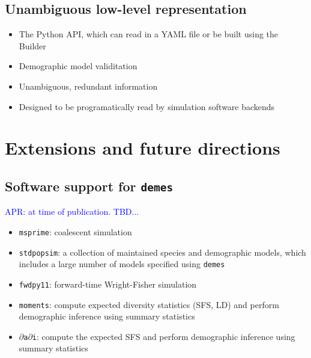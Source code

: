 \documentclass[11pt]{article}
\newenvironment{code}{\captionsetup{type=listing}\centering}{}
\newcommand{\msprime}[0]{\texttt{msprime}}
\newcommand{\stdpopsim}[0]{\texttt{stdpopsim}}
\newcommand{\demes}[0]{\texttt{demes}}
\newcommand{\moments}[0]{\texttt{moments}}
\newcommand{\dadi}[0]{\texttt{$\partial$a$\partial$i}}
\newcommand{\fwdpy}[0]{\texttt{fwdpy11}}
\newcommand{\aprcomment}[1]{{\textcolor{blue}{APR: #1}}}
\begin{document}
\begin{code}
\begin{tcolorbox}
\inputminted[linenos,numbersep=5pt]{yaml}{models/IM.yaml}
\end{tcolorbox}
\label{code:im_model}
\end{code}

\subsection*{Unambiguous low-level representation}

\begin{itemize}
    \item The Python API, which can read in a YAML file or be built using the
        Builder
    \item Demographic model validitation
    \item Unambiguous, redundant information
    \item Designed to be programatically read by simulation software backends
\end{itemize}

\section*{Extensions and future directions}

\subsection*{Software support for \demes}
\aprcomment{at time of publication. TBD...}
\begin{itemize}
    \item \msprime: coalescent simulation \citep{kelleher2016efficient}
    \item \stdpopsim: a collection of maintained species and demographic models,
        which includes a large number of models specified using \demes
        \citep{adrion2020community}
    \item \fwdpy: forward-time Wright-Fisher simulation \citep{thornton2014c++}
    \item \moments: compute expected diversity statistics (SFS, LD) and perform
        demographic inference using summary statistics
        \citep{jouganous2017inferring,ragsdale2019models}
    \item \dadi: compute the expected SFS and perform demographic inference using
        summary statistics \citep{gutenkunst2009inferring}
\end{itemize}
\end{document}
